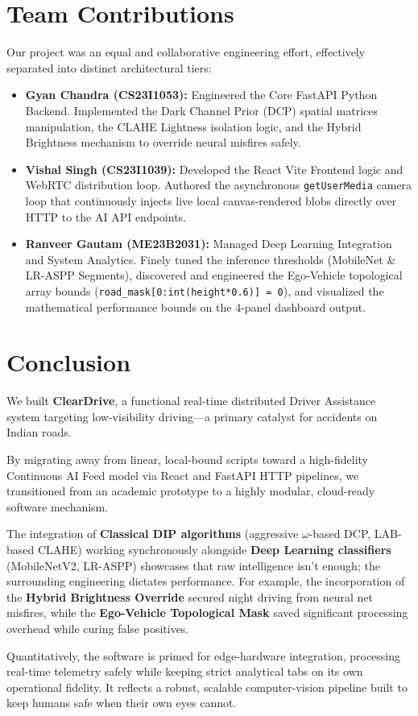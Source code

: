 \documentclass[12pt, a4paper]{article}
\begin{document}
\section{Team Contributions}

Our project was an equal and collaborative engineering effort, effectively separated into distinct architectural tiers:

\begin{itemize}
    \item \textbf{Gyan Chandra (CS23I1053):} Engineered the Core FastAPI Python Backend. Implemented the Dark Channel Prior (DCP) spatial matrices manipulation, the CLAHE Lightness isolation logic, and the Hybrid Brightness mechanism to override neural misfires safely.
    \item \textbf{Vishal Singh (CS23I1039):} Developed the React Vite Frontend logic and WebRTC distribution loop. Authored the asynchronous \texttt{getUserMedia} camera loop that continuously injects live local canvas-rendered blobs directly over HTTP to the AI API endpoints.
    \item \textbf{Ranveer Gautam (ME23B2031):} Managed Deep Learning Integration and System Analytics. Finely tuned the inference thresholds (MobileNet \& LR-ASPP Segments), discovered and engineered the Ego-Vehicle topological array bounds (\texttt{road\_mask[0:int(height*0.6)] = 0}), and visualized the mathematical performance bounds on the 4-panel dashboard output.
\end{itemize}

\section{Conclusion}

We built \textbf{ClearDrive}, a functional real-time distributed Driver Assistance system targeting low-visibility driving—a primary catalyst for accidents on Indian roads.

By migrating away from linear, local-bound scripts toward a high-fidelity Continuous AI Feed model via React and FastAPI HTTP pipelines, we transitioned from an academic prototype to a highly modular, cloud-ready software mechanism. 

The integration of \textbf{Classical DIP algorithms} (aggressive $\omega$-based DCP, LAB-based CLAHE) working synchronously alongside \textbf{Deep Learning classifiers} (MobileNetV2, LR-ASPP) showcases that raw intelligence isn't enough; the surrounding engineering dictates performance. For example, the incorporation of the \textbf{Hybrid Brightness Override} secured night driving from neural net misfires, while the \textbf{Ego-Vehicle Topological Mask} saved significant processing overhead while curing false positives.

Quantitatively, the software is primed for edge-hardware integration, processing real-time telemetry safely while keeping strict analytical tabs on its own operational fidelity. It reflects a robust, scalable computer-vision pipeline built to keep humans safe when their own eyes cannot.
\end{document}
